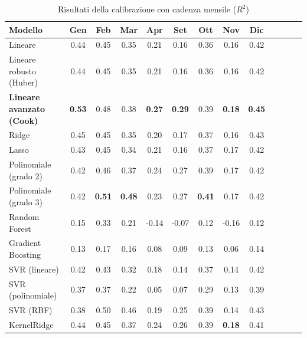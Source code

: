 \begin{table}[H]
    \footnotesize
    \centering
    \def\arraystretch{0.95}
    \begin{tabular}{|l|c|c|c|c|c|c|c|c|c|c|c|c|}
    \hline
        \textbf{Modello} & \textbf{Gen} & \textbf{Feb} & \textbf{Mar} & \textbf{Apr} & \textbf{Set} & \textbf{Ott} & \textbf{Nov} & \textbf{Dic} \\ \hline
        Lineare & 0.44 & 0.45 & 0.35 & 0.21 & 0.16 & 0.36 & 0.16 & 0.42 \\ \hline
        Lineare robusto (Huber) & 0.44 & 0.45 & 0.35 & 0.21 & 0.16 & 0.36 & 0.16 & 0.42 \\ \hline
        \textbf{Lineare avanzato (Cook)} & \textbf{0.53} & 0.48 & 0.38 & \textbf{0.27} & \textbf{0.29} & 0.39 & \textbf{0.18} & \textbf{0.45} \\ \hline
        Ridge & 0.45 & 0.45 & 0.35 & 0.20 & 0.17 & 0.37 & 0.16 & 0.43 \\ \hline
        Lasso & 0.43 & 0.45 & 0.34 & 0.21 & 0.16 & 0.37 & 0.17 & 0.42 \\ \hline
        Polinomiale (grado 2) & 0.42 & 0.46 & 0.37 & 0.24 & 0.27 & 0.39 & 0.17 & 0.42 \\ \hline
        Polinomiale (grado 3) & 0.42 & \textbf{0.51} & \textbf{0.48} & 0.23 & 0.27 & \textbf{0.41} & 0.17 & 0.42 \\ \hline
        Random Forest & 0.15 & 0.33 & 0.21 & -0.14 & -0.07 & 0.12 & -0.16 & 0.12 \\ \hline
        Gradient Boosting & 0.13 & 0.17 & 0.16 & 0.08 & 0.09 & 0.13 & 0.06 & 0.14 \\ \hline
        SVR (lineare) & 0.42 & 0.43 & 0.32 & 0.18 & 0.14 & 0.37 & 0.14 & 0.42 \\ \hline
        SVR (polinomiale) & 0.37 & 0.37 & 0.22 & 0.05 & 0.07 & 0.29 & 0.13 & 0.39 \\ \hline
        SVR (RBF) & 0.38 & 0.50 & 0.46 & 0.19 & 0.25 & 0.39 & 0.14 & 0.43 \\ \hline
        KernelRidge & 0.44 & 0.45 & 0.37 & 0.24 & 0.26 & 0.39 & \textbf{0.18} & 0.41 \\ \hline
    \end{tabular}
    \captionsetup{justification=centering}
    \caption{Risultati della calibrazione  con cadenza mensile ($R^2$)}
    \label{fig:risultati-no2-mese}
\end{table}

